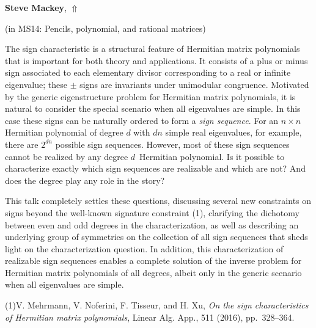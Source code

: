 \documentclass[ILAS2025-program.tex]{subfiles}
\begin{document}
\hypertarget{down0214}{}\begin{ilasabstract}
    
\textbf{Steve Mackey},  \hfill \hyperlink{up0214}{$\Uparrow$}
    
    
(in {\color{mstitle}MS14: Pencils, polynomial, and rational matrices})
        
\mtskip
    The sign characteristic is a structural feature of Hermitian matrix polynomials
that is important for both theory and applications. 
It consists of a plus or minus sign associated to each elementary divisor
corresponding to a real or infinite eigenvalue;
these $\pm$ signs are invariants under unimodular congruence.
Motivated by the generic eigenstructure problem
for Hermitian matrix polynomials,
it is natural to consider the special scenario 
when all eigenvalues are simple.
In this case these signs can be naturally ordered to form a \emph{sign sequence}. 
 For an $n \times n$ Hermitian polynomial of degree $d$
with $dn$ simple real eigenvalues, for example, 
there are $2^{dn}$ possible sign sequences.
However, most of these sign sequences 
cannot be realized by any degree $d$ \,Hermitian polynomial. 
Is it possible to characterize exactly which sign sequences 
are realizable and which are not? 
And does the degree play any role in the story?

This talk completely settles these questions, 
discussing several new constraints on signs 
beyond the well-known signature constraint (1),
clarifying the dichotomy between even and odd degrees 
in the characterization,
as well as describing an underlying group of symmetries 
on the collection of all sign sequences 
that sheds light on the characterization question. 
In addition,
this characterization of realizable sign sequences enables a complete solution 
of the inverse problem for Hermitian matrix polynomials of all degrees, 
albeit only in the generic scenario when all eigenvalues are simple.

\noindent 
(1){V. Mehrmann, V. Noferini, F. Tisseur, and H. Xu},
 {\em On the sign characteristics of Hermitian matrix polynomials}, 
    Linear Alg. App., 511 (2016), pp.~328--364.

\end{ilasabstract}
    
\end{document}
